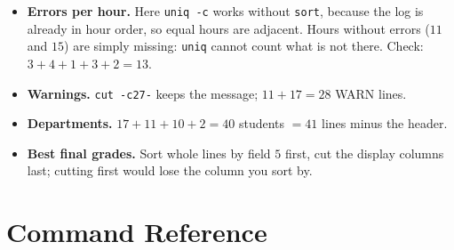 \documentclass[11pt,a4paper]{article}
\newcommand{\cmd}[1]{\texttt{#1}}
\begin{document}
\begin{itemize}
  \item \textbf{Errors per hour.} Here \cmd{uniq -c} works without \cmd{sort}, because the log is already in hour order, so equal hours are adjacent. Hours without errors ($11$ and $15$) are simply missing: \cmd{uniq} cannot count what is not there. Check: $3 + 4 + 1 + 3 + 2 = 13$.
  \item \textbf{Warnings.} \cmd{cut -c27-} keeps the message; $11 + 17 = 28$ WARN lines.
  \item \textbf{Departments.} $17 + 11 + 10 + 2 = 40$ students $= 41$ lines minus the header.
  \item \textbf{Best final grades.} Sort whole lines by field $5$ first, cut the display columns last; cutting first would lose the column you sort by.
\end{itemize}

\section{Command Reference}
\label{sec:ref}
\end{document}
